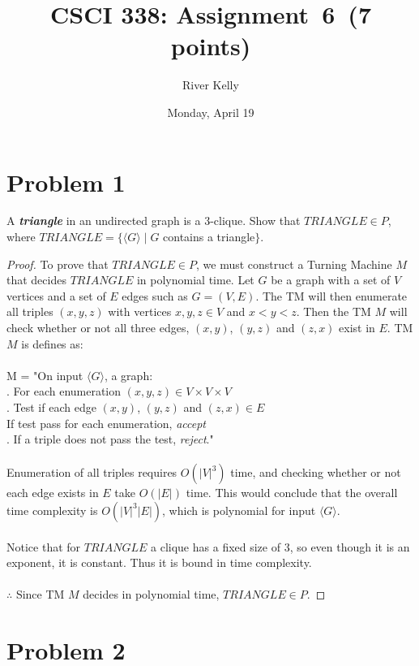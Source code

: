 \documentclass[11pt]{article}
\title{CSCI 338: Assignment~6~(7 points)}
\author{River Kelly}
\date{Monday, April 19}
\begin{document}
\maketitle

\newpage
\section*{Problem 1}

A \textbf{\textit{triangle}} in an undirected graph is a 3-clique.
Show that $TRIANGLE \in P$, where $TRIANGLE = \{ \langle G \rangle \mid G$ contains a triangle$\}$.

\begin{proof}
To prove that $TRIANGLE \in P$, we must construct a Turning Machine $M$ that decides $TRIANGLE$ in polynomial time.
Let $G$ be a graph with a set of $V$ vertices and a set of $E$ edges such as $G = (V,E)$. 
The TM will then enumerate all triples $(x,y,z)$ with vertices $x,y,z \in V$ and $x < y < z$.
Then the TM $M$ will check whether or not all three edges, $(x,y)$, $(y,z)$ and $(z,x)$ exist in $E$. TM $M$ is defines as:\\\\
M = "On input $\langle G \rangle$, a graph:\\
. For each enumeration $(x,y,z) \in V \times V \times V$ \\
. \indent Test if each edge $(x,y)$, $(y,z)$ and $(z,x) \in E$ \\ \indent \indent If test pass for each enumeration, \textit{accept} \\
. If a triple does not pass the test, \textit{reject}."\\\\
Enumeration of all triples requires $O(|V|^{3})$ time, and checking whether or not each edge exists in $E$ take $O(|E|)$ time. This would conclude that the overall time complexity is $O(|V|^{3} |E|)$, which is polynomial for input $\langle G \rangle$.\\\\
Notice that for $TRIANGLE$ a clique has a fixed size of 3, so even though it is an exponent, it is constant. Thus it is bound in time complexity.\\\\
$\therefore$ Since TM $M$ decides in polynomial time, $TRIANGLE \in P$.
\end{proof}

\newpage
\section*{Problem 2}
\end{document}

